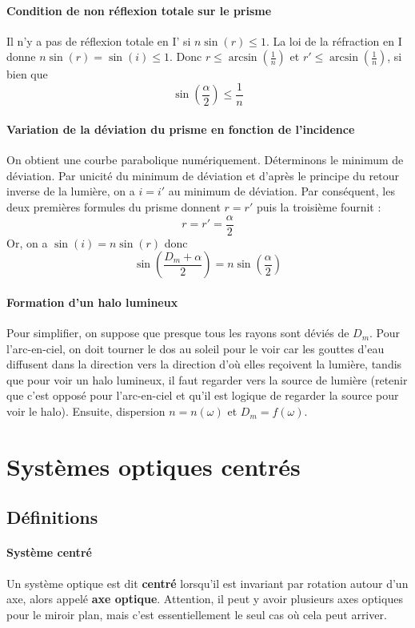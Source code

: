 \documentclass[french]{book}
\theoremstyle{plain}
\theoremstyle{definition}
\theoremstyle{remark}
\begin{document}
\paragraph{Condition de non réflexion totale sur le prisme} Il n'y a pas de réflexion totale en I' si $n\sin(r)\leqslant1$. La loi de la réfraction en I donne $n\sin(r)=\sin(i)\leqslant1$. Donc $\displaystyle r\leqslant\arcsin\left(\frac{1}{n}\right)$ et $\displaystyle r'\leqslant\arcsin\left(\frac{1}{n}\right)$, si bien que $$\sin\left(\frac{\alpha}{2}\right)\leqslant\frac{1}{n}$$
\paragraph{Variation de la déviation du prisme en fonction de l'incidence} On obtient une courbe parabolique numériquement. Déterminons le minimum de déviation. Par unicité du minimum de déviation et d'après le principe du retour inverse de la lumière, on a $i=i'$ au minimum de déviation. Par conséquent, les deux premières formules du prisme donnent $r=r'$ puis la troisième fournit : $$r=r'=\frac{\alpha}{2}$$ Or, on a $\sin(i)=n\sin(r)$ donc $$\sin\left(\frac{D_m+\alpha}{2}\right)=n\sin\left(\frac{\alpha}{2}\right)$$
\paragraph{Formation d'un halo lumineux} Pour simplifier, on suppose que presque tous les rayons sont déviés de $D_m$. Pour l'arc-en-ciel, on doit tourner le dos au soleil pour le voir car les gouttes d'eau diffusent dans la direction vers la direction d'où elles reçoivent la lumière, tandis que pour voir un halo lumineux, il faut regarder vers la source de lumière (retenir que c'est opposé pour l'arc-en-ciel et qu'il est logique de regarder la source pour voir le halo). Ensuite, dispersion $n=n(\omega)$ et $D_m=f(\omega)$.
\section{Systèmes optiques centrés}
\subsection{Définitions}
\paragraph{Système centré} Un système optique est dit \textbf{centré} lorsqu'il est invariant par rotation autour d'un axe, alors appelé \textbf{axe optique}. Attention, il peut y avoir plusieurs axes optiques pour le miroir plan, mais c'est essentiellement le seul cas où cela peut arriver.
\end{document}
